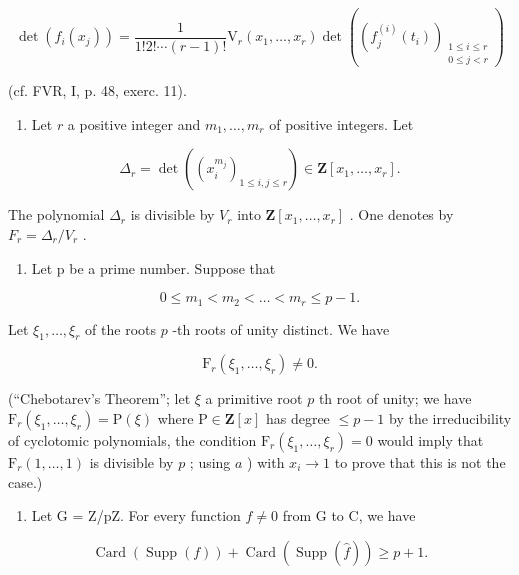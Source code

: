 \[
\det (f_{i}(x_{j})) = \frac{1}{1!2!\cdots(r - 1)!}\mathrm{V}_{r}(x_{1},\ldots ,x_{r})\det ((f_{j}^{(i)}(t_{i}))_{\substack{1\leqslant i\leqslant r\\ 0\leqslant j <   r}})
\]

(cf. FVR, I, p. 48, exerc. 11).

\begin{enumerate}
\def\labelenumi{\alph{enumi})}
\setcounter{enumi}{1}
\tightlist
\item
  Let \(r\) a positive integer and \(m_1, \ldots, m_r\) of positive integers. Let
\end{enumerate}

\[
\Delta_ {r} = \det ((x _ {i} ^ {m _ {j}}) _ {1 \leqslant i, j \leqslant r}) \in \mathbf {Z} [ x _ {1}, \dots , x _ {r} ].
\]

The polynomial \(\Delta_r\) is divisible by \(V_r\) into \(\mathbf{Z}[x_1, \ldots, x_r]\) . One denotes by \(F_r = \Delta_r / V_r\) .

\begin{enumerate}
\def\labelenumi{\alph{enumi})}
\setcounter{enumi}{2}
\tightlist
\item
  Let p be a prime number. Suppose that
\end{enumerate}

\[
0 \leqslant m _ {1} <   m _ {2} <   \dots <   m _ {r} \leqslant p - 1.
\]

Let \(\xi_{1},\ldots,\xi_{r}\) of the roots \(p\) -th roots of unity distinct. We have

\[
\mathrm{F} _ {r} (\xi_ {1}, \ldots , \xi_ {r}) \neq 0.
\]

(“Chebotarev’s Theorem”; let \(\xi\) a primitive root \(p\) th root of unity; we have \(\mathrm{F}_r(\xi_1, \ldots, \xi_r) = \mathrm{P}(\xi)\) where \(\mathrm{P} \in \mathbf{Z}[x]\) has degree \(\leqslant p - 1\) by the irreducibility of cyclotomic polynomials, the condition \(\mathrm{F}_r(\xi_1, \ldots, \xi_r) = 0\) would imply that \(\mathrm{F}_r(1, \ldots, 1)\) is divisible by \(p\) ; using \(a\) ) with \(x_i \to 1\) to prove that this is not the case.)

\begin{enumerate}
\def\labelenumi{\alph{enumi})}
\setcounter{enumi}{3}
\tightlist
\item
  Let G = Z/pZ. For every function \(f \neq 0\) from G to C, we have
\end{enumerate}

\[
\operatorname{Card} (\operatorname{Supp} (f)) + \operatorname{Card} (\operatorname{Supp} (\widehat {f})) \geqslant p + 1.
\]

